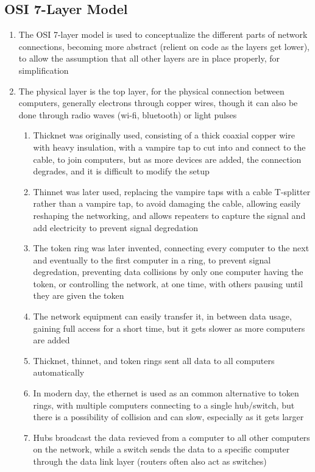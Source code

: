 \documentclass[11 pt, twoside]{article}
\begin{document}
\begin{enumerate}
\subsection{OSI 7-Layer Model}
\begin{enumerate}
\item The OSI 7-layer model is used to conceptualize the different parts of network connections, becoming more abstract (relient on code as the layers get lower), to allow the assumption that all other layers are in place properly, for simplification
\item The physical layer is the top layer, for the physical connection between computers, generally electrons through copper wires, though it can also be done through radio waves (wi-fi, bluetooth) or light pulses
\begin{enumerate}
\item Thicknet was originally used, consisting of a thick coaxial copper wire with heavy insulation, with a vampire tap to cut into and connect to the cable, to join computers, but as more devices are added, the connection degrades, and it is difficult to modify the setup
\item Thinnet was later used, replacing the vampire taps with a cable T-splitter rather than a vampire tap, to avoid damaging the cable, allowing easily reshaping the networking, and allows repeaters to capture the signal and add electricity to prevent signal degredation
\item The token ring was later invented, connecting every computer to the next and eventually to the first computer in a ring, to prevent signal degredation, preventing data collisions by only one computer having the token, or controlling the network, at one time, with others pausing until they are given the token
\item The network equipment can easily transfer it, in between data usage, gaining full access for a short time, but it gets slower as more computers are added
\item Thicknet, thinnet, and token rings sent all data to all computers automatically
\item In modern day, the ethernet is used as an common alternative to token rings, with multiple computers connecting to a single hub/switch, but there is a possibility of collision and can slow, especially as it gets larger
\item Hubs broadcast the data revieved from a computer to all other computers on the network, while a switch sends the data to a specific computer through the data link layer (routers often also act as switches)

\end{enumerate}
\end{enumerate}
\end{enumerate}
\end{document}
